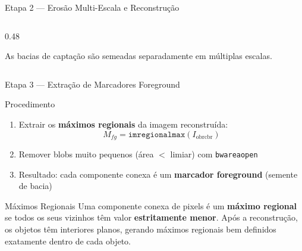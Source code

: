 \documentclass[aspectratio=169,12pt]{beamer}
\begin{document}
\begin{frame}{Etapa 2 --- Eros\~ao Multi-Escala e Reconstru\c{c}\~ao}
\begin{columns}[T]
\begin{column}{0.48\textwidth}

\vspace{0.4cm}
{\footnotesize As bacias de capta\c{c}\~ao s\~ao semeadas separadamente em m\'ultiplas escalas.}
\end{column}
\end{columns}

\end{frame}

\begin{frame}{Etapa 3 --- Extra\c{c}\~ao de Marcadores Foreground}

\begin{block}{Procedimento}
\begin{enumerate}
  \item Extrair os \textbf{m\'aximos regionais} da imagem reconstru\'ida:
  \[
    M_{fg} = \texttt{imregionalmax}(I_{\mathrm{obrcbr}})
  \]
  \item Remover blobs muito pequenos (\'area $<$ limiar) com \texttt{bwareaopen}
  \item Resultado: cada componente conexa \'e um \textbf{marcador foreground} (semente de bacia)
\end{enumerate}
\end{block}

\vspace{0.3cm}

\begin{exampleblock}{M\'aximos Regionais}
Uma componente conexa de pixels \'e um \textbf{m\'aximo regional} se todos os seus vizinhos t\^em valor \textbf{estritamente menor}. Ap\'os a reconstru\c{c}\~ao, os objetos t\^em interiores planos, gerando m\'aximos regionais bem definidos exatamente dentro de cada objeto.
\end{exampleblock}

\end{frame}
\end{document}
